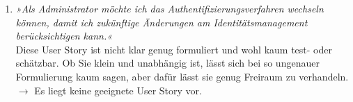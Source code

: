\documentclass[main.tex]{subfiles}
\begin{document}
\begin{enumerate}
    \item \textit{»Als Administrator möchte ich das Authentifizierungsverfahren wechseln können, damit ich zukünftige Änderungen am Identitätsmanagement berücksichtigen kann.«}\\
    Diese User Story ist nicht klar genug formuliert und wohl kaum test- oder schätzbar. Ob Sie klein und unabhängig ist, lässt sich bei so ungenauer Formulierung kaum sagen, aber dafür lässt sie genug Freiraum zu verhandeln. \\
    $\rightarrow$ Es liegt keine geeignete User Story vor.
\end{enumerate}
\end{document}
